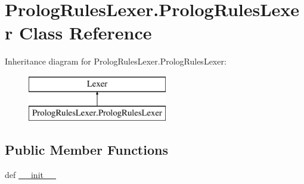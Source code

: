 \hypertarget{class_prolog_rules_lexer_1_1_prolog_rules_lexer}{}\section{Prolog\+Rules\+Lexer.\+Prolog\+Rules\+Lexer Class Reference}
\label{class_prolog_rules_lexer_1_1_prolog_rules_lexer}
Inheritance diagram for Prolog\+Rules\+Lexer.\+Prolog\+Rules\+Lexer\+:\begin{figure}[H]
\begin{center}
\leavevmode
\includegraphics[height=2.000000cm]{class_prolog_rules_lexer_1_1_prolog_rules_lexer}
\end{center}
\end{figure}
\subsection*{Public Member Functions}
\begin{DoxyCompactItemize}
\item 
def \hyperlink{class_prolog_rules_lexer_1_1_prolog_rules_lexer_ad395b7b961012e4ae227eaa4b94147f7}{\+\_\+\+\_\+init\+\_\+\+\_\+}
\end{DoxyCompactItemize}
